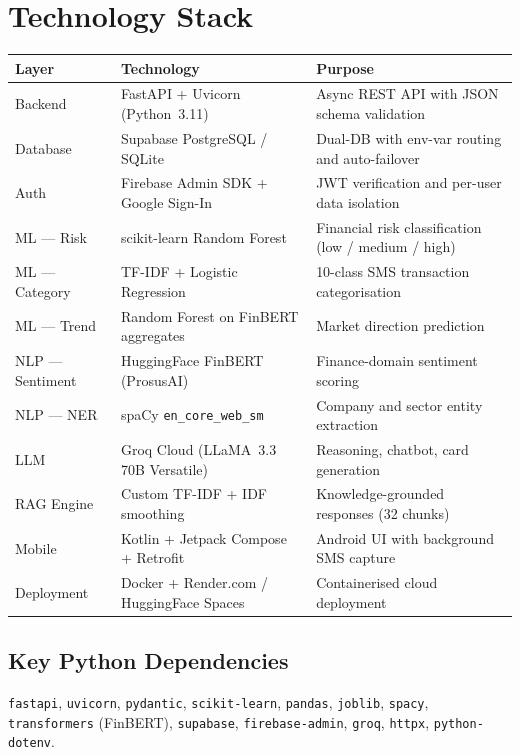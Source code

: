 \documentclass[12pt,a4paper]{article}
\begin{document}
\newpage
\section{Technology Stack}

\begin{table}[h!]
\centering
\renewcommand{\arraystretch}{1.25}
\begin{tabularx}{\textwidth}{l l X}
\toprule
\textbf{Layer} & \textbf{Technology} & \textbf{Purpose} \\
\midrule
Backend       & FastAPI + Uvicorn (Python~3.11)            & Async REST API with JSON schema validation \\
Database      & Supabase PostgreSQL / SQLite               & Dual-DB with env-var routing and auto-failover \\
Auth          & Firebase Admin SDK + Google Sign-In        & JWT verification and per-user data isolation \\
ML --- Risk   & scikit-learn Random Forest                 & Financial risk classification (low / medium / high) \\
ML --- Category & TF-IDF + Logistic Regression             & 10-class SMS transaction categorisation \\
ML --- Trend  & Random Forest on FinBERT aggregates        & Market direction prediction \\
NLP --- Sentiment & HuggingFace FinBERT (ProsusAI)        & Finance-domain sentiment scoring \\
NLP --- NER   & spaCy \texttt{en\_core\_web\_sm}           & Company and sector entity extraction \\
LLM           & Groq Cloud (LLaMA~3.3 70B Versatile)      & Reasoning, chatbot, card generation \\
RAG Engine    & Custom TF-IDF + IDF smoothing              & Knowledge-grounded responses (32 chunks) \\
Mobile        & Kotlin + Jetpack Compose + Retrofit        & Android UI with background SMS capture \\
Deployment    & Docker + Render.com / HuggingFace Spaces   & Containerised cloud deployment \\
\bottomrule
\end{tabularx}
\end{table}

\subsection{Key Python Dependencies}
\texttt{fastapi}, \texttt{uvicorn}, \texttt{pydantic}, \texttt{scikit-learn}, \texttt{pandas}, \texttt{joblib}, \texttt{spacy}, \texttt{transformers} (FinBERT), \texttt{supabase}, \texttt{firebase-admin}, \texttt{groq}, \texttt{httpx}, \texttt{python-dotenv}.
\end{document}
